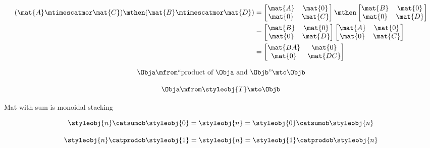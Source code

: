 {\begin{forslides}
    \begin{align}\label{eq:parallelism-057}
        (\mat{A} \mtimescatmor \mat{C}) \mthen (\mat{B} \mtimescatmor \mat{D}) & =
        \begin{bmatrix}
            \mat{A} & \mat{0} \\
            \mat{0} & \mat{C}
        \end{bmatrix}
        \mthen
        \begin{bmatrix}
            \mat{B} & \mat{0} \\
            \mat{0} & \mat{D}
        \end{bmatrix} \\
                                                                               & =
        \begin{bmatrix}
            \mat{B} & \mat{0} \\
            \mat{0} & \mat{D}
        \end{bmatrix}
        \begin{bmatrix}
            \mat{A} & \mat{0} \\
            \mat{0} & \mat{C}
        \end{bmatrix} \\
                                                                               & =
        \begin{bmatrix}
            \mat{BA} & \mat{0}  \\
            \mat{0}  & \mat{DC}
        \end{bmatrix}
    \end{align}

    \begin{equation}
        \label{eq:parallelism-058}
        \Obja \mfrom \text{``product of } \Obja \text{ and } \Objb \text{''} \mto \Objb
    \end{equation}

    \begin{equation}
        \label{eq:parallelism-059}
        \Obja \mfrom \styleobj{T} \mto \Objb
    \end{equation}

    Mat with sum is monoidal stacking

    \begin{equation}
        \label{eq:parallelism-060}
        \styleobj{n} \catsumob \styleobj{0} = \styleobj{n} = \styleobj{0} \catsumob \styleobj{n}
    \end{equation}

    \begin{equation}
        \label{eq:parallelism-061}
        \styleobj{n} \catprodob \styleobj{1} = \styleobj{n} = \styleobj{1} \catprodob \styleobj{n}
    \end{equation}


\end{forslides}}
